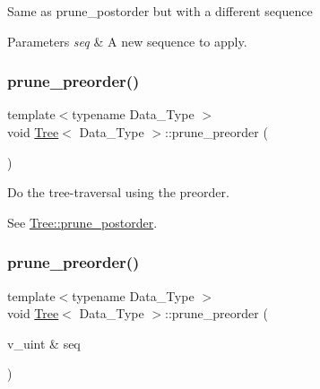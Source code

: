 Same as {\ttfamily prune\+\_\+postorder} but with a different sequence 
\begin{DoxyParams}{Parameters}
{\em seq} & A new sequence to apply. \\
\hline
\end{DoxyParams}
\mbox{\label{classTree_a960ac327488daa6b2de86ea7be5aee7d}} 
\subsubsection{\texorpdfstring{prune\+\_\+preorder()}{prune\_preorder()}\hspace{0.1cm}{\footnotesize\ttfamily [1/2]}}
{\footnotesize\ttfamily template$<$typename Data\+\_\+\+Type $>$ \\
void \hyperlink{classTree}{Tree}$<$ Data\+\_\+\+Type $>$\+::prune\+\_\+preorder (\begin{DoxyParamCaption}{ }\end{DoxyParamCaption})\hspace{0.3cm}{\ttfamily [inline]}}



Do the tree-\/traversal using the preorder. 

See \hyperlink{classTree_a7e50f34814e6f158cbff23dbe0312a8e}{Tree\+::prune\+\_\+postorder}. \mbox{\label{classTree_afb20a52559dd24b773a694dcbb76ef5c}} 
\subsubsection{\texorpdfstring{prune\+\_\+preorder()}{prune\_preorder()}\hspace{0.1cm}{\footnotesize\ttfamily [2/2]}}
{\footnotesize\ttfamily template$<$typename Data\+\_\+\+Type $>$ \\
void \hyperlink{classTree}{Tree}$<$ Data\+\_\+\+Type $>$\+::prune\+\_\+preorder (\begin{DoxyParamCaption}\item[{v\+\_\+uint \&}]{seq }\end{DoxyParamCaption})\hspace{0.3cm}{\ttfamily [inline]}}



